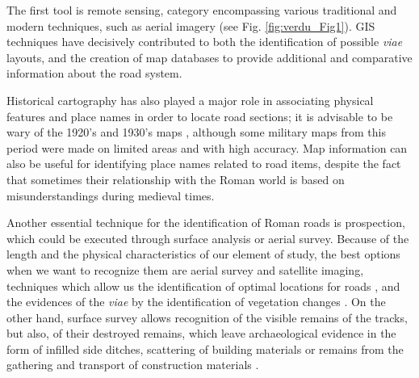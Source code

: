 	
	The first tool is remote sensing, category encompassing various traditional and modern techniques, such as aerial imagery (see Fig. \ref{fig:verdu_Fig1}). GIS techniques have decisively contributed to both the identification of possible \textit{viae} layouts, and the creation of map databases to provide additional and comparative information about the road system.
	
	
	Historical cartography has also played a major role in associating physical features and place names in order to locate road sections; it is advisable to be wary of the 1920's and 1930's maps \parencite[12]{Moreno_2010}, although some military maps from this period were made on limited areas and with high accuracy. Map information can also be useful for identifying place names related to road items, despite the fact that sometimes their relationship with the Roman world is based on misunderstandings during medieval times.
	
	
	Another essential technique for the identification of Roman roads is prospection, which could be executed through surface analysis or aerial survey. Because of the length and the physical characteristics of our element of study, the best options when we want to recognize them are aerial survey and satellite imaging, techniques which allow us the identification of optimal locations for roads \parencite[412]{Sillières_1990}, and the evidences of the \textit{viae} by the identification of vegetation changes \parencite[416]{Sillières_1990}. On the other hand, surface survey allows recognition of the visible remains of the tracks, but also, of their destroyed remains, which leave archaeological evidence in the form of infilled side ditches, scattering of building materials or remains from the gathering and transport of construction materials \parencite[31]{Moreno_2009}.
	
